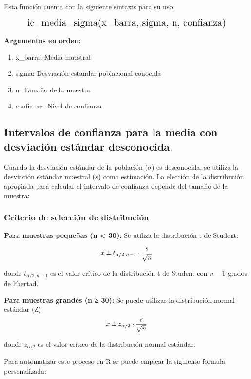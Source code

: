 \documentclass[
  spanish,
  letterpaper,
]{book}
\begin{document}
Esta función cuenta con la siguiente sintaxis para su uso:

\[
\Large \text{ic\_media\_sigma(x\_barra, sigma, n, confianza)}
\]

\textbf{Argumentos en orden:}

\begin{enumerate}
\def\labelenumi{\arabic{enumi}.}
\item
  x\_barra: Media muestral
\item
  sigma: Desviación estandar poblacional conocida
\item
  n: Tamaño de la muestra
\item
  confianza: Nivel de confianza
\end{enumerate}

\subsection{Intervalos de confianza para la media con desviación
estándar
desconocida}\label{intervalos-de-confianza-para-la-media-con-desviaciuxf3n-estuxe1ndar-desconocida}

Cuando la desviación estándar de la población (\(\sigma\)) es
desconocida, se utiliza la desviación estándar muestral (\(s\)) como
estimación. La elección de la distribución apropiada para calcular el
intervalo de confianza depende del tamaño de la muestra:

\subsubsection{Criterio de selección de
distribución}\label{criterio-de-selecciuxf3n-de-distribuciuxf3n}

\textbf{Para muestras pequeñas (n \textless{} 30):} Se utiliza la
distribución t de Student:

\[\huge \bar{x} \pm t_{\alpha/2, n-1} \cdot \frac{s}{\sqrt{n}} \]

donde \(t_{\alpha/2, n-1}\) es el valor crítico de la distribución t de
Student con \(n-1\) grados de libertad.

\textbf{Para muestras grandes (n ≥ 30):} Se puede utilizar la
distribución normal estándar (Z)\\
\[\huge \bar{x} \pm z_{\alpha/2} \cdot \frac{s}{\sqrt{n}}\]

donde \(z_{\alpha/2}\) es el valor crítico de la distribución normal
estándar.

Para automatizar este proceso en R se puede emplear la siguiente formula
personalizada:
\end{document}
